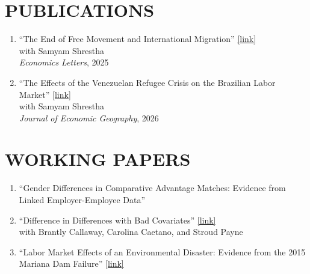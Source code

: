 \documentclass[11pt,letterpaper]{article}
\begin{document}
\section*{PUBLICATIONS}
\begin{enumerate}
    \item ``The End of Free Movement and International Migration'' \href{https://www.sciencedirect.com/science/article/abs/pii/S0165176525005968}{[link]} \\
    with Samyam Shrestha \\
    \textit{Economics Letters}, 2025

    \item ``The Effects of the Venezuelan Refugee Crisis on the Brazilian Labor Market'' \href{https://doi.org/10.1093/jeg/lbaf047}{[link]} \\
    with Samyam Shrestha \\
    \textit{Journal of Economic Geography}, 2026
\end{enumerate}

\section*{WORKING PAPERS}
\begin{enumerate}
    \item ``Gender Differences in Comparative Advantage Matches: Evidence from Linked Employer-Employee Data'' \\

    \item ``Difference in Differences with Bad Covariates'' \href{https://arxiv.org/abs/2306.01868}{[link]} \\
    with Brantly Callaway, Carolina Caetano, and Stroud Payne

    \item ``Labor Market Effects of an Environmental Disaster: Evidence from the 2015 Mariana Dam Failure'' \href{https://arxiv.org/abs/2302.04201}{[link]}
\end{enumerate}

\end{document}
